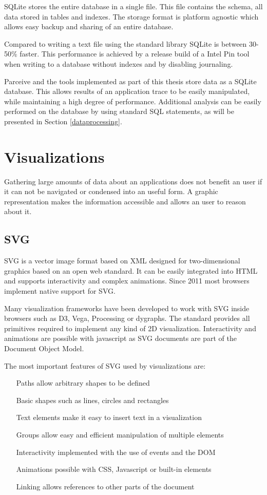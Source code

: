 SQLite stores the entire database in a single file. This file contains the schema, all data stored in tables and indexes. The storage format is platform agnostic which allows easy backup and sharing of an entire database.

Compared to writing a text file using the standard library SQLite is between 30-50\% faster. This performance is achieved by a release build of a Intel Pin tool when writing to a database without indexes and by disabling journaling.

Parceive and the tools implemented as part of this thesis store data as a SQLite database. This allows results of an application trace to be easily manipulated, while maintaining a high degree of performance. Additional analysis can be easily performed on the database by using standard SQL statements, as will be presented in Section \ref{dataprocessing}.

\section {Visualizations}

Gathering large amounts of data about an applications does not benefit an user if it can not be navigated or condensed into an useful form. A graphic representation makes the information accessible and allows an user to reason about it.

\subsection {SVG}

SVG \cite{svg11} is a vector image format based on XML designed for two-dimensional graphics based on an open web standard. It can be easily integrated into HTML and supports interactivity and complex animations. Since 2011 most browsers implement native support for SVG.

Many visualization frameworks have been developed to work with SVG inside browsers such as D3, Vega, Processing or dygraphs. The standard provides all primitives required to implement any kind of 2D visualization. Interactivity and animations are possible with javascript as SVG documents are part of the Document Object Model.

The most important features of SVG used by visualizations are:

\begin{itemize}
	\item[Paths] allow arbitrary shapes to be defined
	\item[Basic shapes] such as lines, circles and rectangles
	\item[Text elements] make it easy to insert text in a visualization
	\item[Groups] allow easy and efficient manipulation of multiple elements
	\item[Interactivity] implemented with the use of events and the DOM
	\item[Animations] possible with CSS, Javascript or built-in elements
	\item[Linking] allows references to other parts of the document
\end{itemize}


